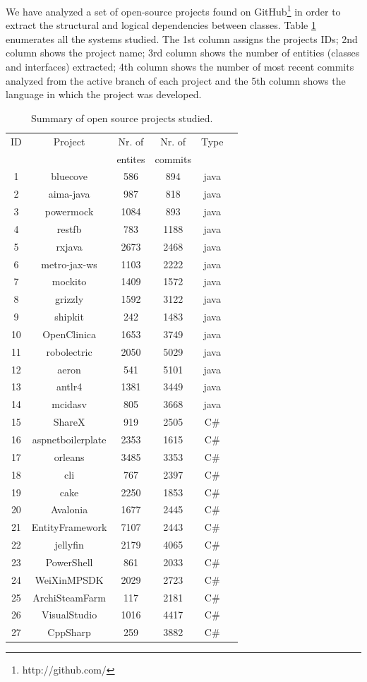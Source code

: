 \documentclass[a4paper,twoside]{article}
\begin{document}
We have analyzed a set of open-source projects found on GitHub\footnote{http://github.com/} \cite{Kalliamvakou2016} in order to extract the structural and logical dependencies between classes. Table \ref{table:1} enumerates all the systems studied. The 1st column assigns the projects IDs; 2nd column shows the project name; 3rd column shows the number of entities (classes and interfaces) extracted; 4th column shows the number of most recent commits analyzed from the active branch of each project and the 5th column shows the language in which the project was developed.
\begin{table}[!h]
\renewcommand{\arraystretch}{1.1}
\caption{Summary of open source projects studied.}
\label{table:1}
\centering
\begin{tabular}{|c|c|c|c|c|c|}
\hline
   ID  & Project    & Nr. of & Nr. of& Type\\
     &     & entites & commits & \\
\hline
1	&	bluecove	&	586	&	894	&	java	\\
2	&	aima-java	&	987	&	818	&	java	\\
3	&	powermock	&	1084	&	893	&	java	\\
4	&	restfb	&	783	&	1188	&	java	\\
5	&	rxjava	&	2673	&	2468	&	java	\\
6	&	metro-jax-ws	&	1103	&	2222	&	java	\\
7	&	mockito	&	1409	&	1572	&	java	\\
8	&	grizzly	&	1592	&	3122	&	java	\\
9	&	shipkit	&	242	&	1483	&	java	\\
10	&	OpenClinica	&	1653	&	3749	&	java	\\
11	&	robolectric	&	2050	&	5029	&	java	\\
12	&	aeron	&	541	&	5101	&	java	\\
13	&	antlr4	&	1381	&	3449	&	java	\\
14	&	mcidasv	&	805	&	3668	&	java	\\
15	&	ShareX	&	919	&	2505	&	C\#	\\
16	&	aspnetboilerplate	&	2353	&	1615	&	C\#	\\
17	&	orleans	&	3485	&	3353	&	C\#	\\
18	&	cli	&	767	&	2397	&	C\#	\\
19	&	cake	&	2250	&	1853	&	C\#	\\
20	&	Avalonia	&	1677	&	2445	&	C\#	\\
21	&	EntityFramework	&	7107	&	2443	&	C\#	\\
22	&	jellyfin	&	2179	&	4065	&	C\#	\\
23	&	PowerShell	&	861	&	2033	&	C\#	\\
24	&	WeiXinMPSDK	&	2029	&	2723	&	C\#	\\
25	&	ArchiSteamFarm	&	117	&	2181	&	C\#	\\
26	&	VisualStudio	&	1016	&	4417	&	C\#	\\
27	&	CppSharp	&	259	&	3882	&	C\#	\\
\hline
\end{tabular}
\end{table}
\end{document}
